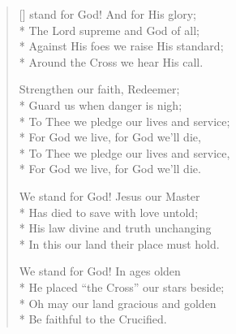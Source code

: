 \newHymn



\settowidth{\versewidth}{We stand for God"! And for his glory}

\begin{verse}[\versewidth]
 stand for God! And for His glory;\\*
The Lord supreme and God of all;\\*
Against His foes we raise His standard;\\*
Around the Cross we hear His call.

\begin{indentedVerse}
\vin Strengthen our faith, Redeemer;\\*
\vin Guard us when danger is nigh;\\*
\vin To Thee we pledge our lives and service;\\*
\vin For God we live, for God we'll die,\\*
\vin To Thee we pledge our lives and service,\\*
\vin For God we live, for God we'll die.
\end{indentedVerse}

We stand for God! Jesus our Master\\*
Has died to save with love untold;\\*
His law divine and truth unchanging\\*
In this our land their place must hold.

We stand for God! In ages olden\\*
He placed ``the Cross'' our stars beside;\\*
Oh may our land gracious and golden\\*
Be faithful to the Crucified.
\end{verse}



